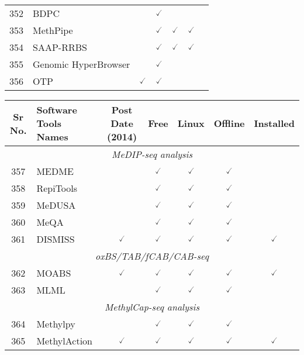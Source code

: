 \documentclass[10pt,letterpaper]{article}
\begin{document}
\begin{table}[!ht]
\begin{adjustwidth}{-2.25in}{0in}
\begin{tabular}{|c|l|c|c|c|c|c|}
352 & BDPC\cite{rohde2008bisulfite} & & $\checked$ & & & \\
353 & MethPipe\cite{song2013reference} & & $\checked$ & $\checked$ & $\checked$ & \\
354 & SAAP-RRBS\cite{sun2012saap} & & $\checked$ & $\checked$ & $\checked$ & \\ 
355 & Genomic HyperBrowser\cite{sandve2013genomic} & & $\checked$ & & & \\
356 & OTP\cite{reisinger2017otp} & $\checked$ & $\checked$ & & & \\ \hline
\end{tabular}
\label{table1}
\end{adjustwidth}
\end{table}

\begin{table}[!ht]
\begin{adjustwidth}{-2.25in}{0in} %
\centering
\begin{tabular}{|c|l|c|c|c|c|c|}
\hline
Sr No. & Software Tools Names & Post Date (2014) & Free & Linux & Offline & Installed \\ \hline
\hline
\multicolumn{7}{|c|}{\textit{MeDIP-seq analysis}} \\ 
\hline
\hline
357 & MEDME\cite{pelizzola2008medme} & & $\checked$ & $\checked$ & $\checked$ & \\
358 & RepiTools\cite{statham2010repitools} & & $\checked$ & $\checked$ & $\checked$ & \\
359 & MeDUSA\cite{wilson2012resources} & & $\checked$ & $\checked$ & $\checked$ & \\
360 & MeQA\cite{huang2011meqa} & & $\checked$ & $\checked$ & $\checked$ & \\
361 & DISMISS\cite{niazi2016dismiss} & $\checked$ & $\checked$ & $\checked$ & $\checked$ & $\checked$ \\
\hline
\multicolumn{7}{|c|}{\textit{oxBS/TAB/fCAB/CAB-seq}} \\ 
\hline
\hline
362 & MOABS\cite{sun2014moabs} & $\checked$ & $\checked$ & $\checked$ & $\checked$ & $\checked$ \\
363 & MLML\cite{qu2013mlml} & & $\checked$ & $\checked$ & $\checked$ & \\ \hline
\hline
\multicolumn{7}{|c|}{\textit{MethylCap-seq analysis}} \\ 
\hline
\hline
364 & Methylpy\cite{sauerberg1992novel} & & $\checked$ & $\checked$ & $\checked$ & \\
365 & MethylAction\cite{bhasin2015methylaction} & $\checked$ & $\checked$ & $\checked$ & $\checked$ & $\checked$ \\ \hline
\end{tabular}
\label{table1}
\end{adjustwidth}
\end{table}
\end{document}
